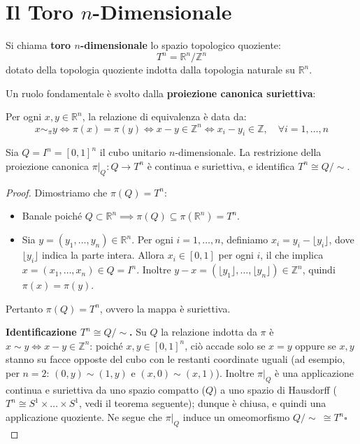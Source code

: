 \vspace{2em}

\section{Il Toro $n$-Dimensionale}

\begin{definicion}
Si chiama \textbf{toro $n$-dimensionale} lo spazio topologico quoziente:
\[
T^n = \mathbb{R}^n \big/ \mathbb{Z}^n
\]
dotato della topologia quoziente indotta dalla topologia naturale su $\mathbb{R}^n$.

Un ruolo fondamentale è svolto dalla \textbf{proiezione canonica suriettiva}:

Per ogni $x, y \in \mathbb{R}^n$, la relazione di equivalenza è data da:
\[
x \sim_\pi y \iff \pi(x) = \pi(y) \iff x - y \in \mathbb{Z}^n \iff x_i - y_i \in \mathbb{Z}, \quad \forall i = 1, \dots, n
\]
\end{definicion}

\begin{prop}
Sia $Q = I^n = [0,1]^n$ il cubo unitario $n$-dimensionale.
La restrizione della proiezione canonica $\pi|_Q: Q \to T^n$ è continua e suriettiva, e identifica $T^n \cong Q / \sim$.
\end{prop}

\begin{proof}
Dimostriamo che $\pi(Q) = T^n$:
\begin{itemize}
    \item [$\subseteq$)] Banale poiché $Q \subset \mathbb{R}^n \implies \pi(Q) \subseteq \pi(\mathbb{R}^n) = T^n$.
    \item [$\supseteq$)] Sia $y = (y_1, \dots, y_n) \in \mathbb{R}^n$. Per ogni $i = 1, \dots, n$, definiamo $x_i = y_i - \lfloor y_i \rfloor$, dove $\lfloor y_i \rfloor$ indica la parte intera.
    Allora $x_i \in [0,1]$ per ogni $i$, il che implica $x = (x_1, \dots, x_n) \in Q = I^n$.
    Inoltre $y - x = (\lfloor y_1 \rfloor, \dots, \lfloor y_n \rfloor) \in \mathbb{Z}^n$, quindi $\pi(x) = \pi(y)$.
\end{itemize}
Pertanto $\pi(Q) = T^n$, ovvero la mappa è suriettiva.

\textbf{Identificazione $T^n \cong Q/\!\sim$.} Su $Q$ la relazione indotta da $\pi$ \`e $x \sim y \iff x - y \in \mathbb{Z}^n$: poich\'e $x,y \in [0,1]^n$, ci\`o accade solo se $x = y$ oppure se $x,y$ stanno su facce opposte del cubo con le restanti coordinate uguali (ad esempio, per $n=2$: $(0,y) \sim (1,y)$ e $(x,0) \sim (x,1)$). Inoltre $\pi|_Q$ \`e una applicazione continua e suriettiva da uno spazio compatto ($Q$) a uno spazio di Hausdorff ($T^n \cong S^1 \times \dots \times S^1$, vedi il teorema seguente); dunque \`e chiusa, e quindi una applicazione quoziente. Ne segue che $\pi|_Q$ induce un omeomorfismo $Q/\!\sim\ \cong T^n$\hfill$\square$
\end{proof}

